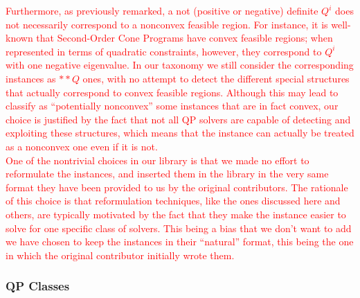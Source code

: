 \textcolor{red}{
Furthermore, as previously remarked, a not (positive or negative) definite $Q^i$ does not necessarily correspond to a nonconvex feasible region. For instance, it is well-known that Second-Order Cone Programs have convex feasible regions; when represented in terms of quadratic constraints, however, they correspond to $Q^i$ with one negative eigenvalue. In our taxonomy we still consider the corresponding instances as $**Q$ ones, with no attempt to detect the different special structures that actually correspond to convex feasible regions. Although this may lead to classify as ``potentially nonconvex'' some instances that are in fact convex, our choice is justified by the fact that not all QP solvers are capable of detecting and exploiting these structures, which means that the instance can actually be treated as a nonconvex one even if it is not.\\
}
\textcolor{red}{
One of the nontrivial choices in our library is that we made no effort to reformulate the instances, and inserted them in the library in the very same format they have been provided to us by the original contributors. The rationale of this choice is that reformulation techniques, like the ones discussed here and others, are typically motivated by the fact that they make the instance easier to solve for one specific class of solvers. This being a bias that we don’t want to add we have chosen to keep the instances in their ``natural'' format, this being the one in which the original contributor initially wrote them.
}


\subsubsection{QP Classes}\label{ssec:classes}

